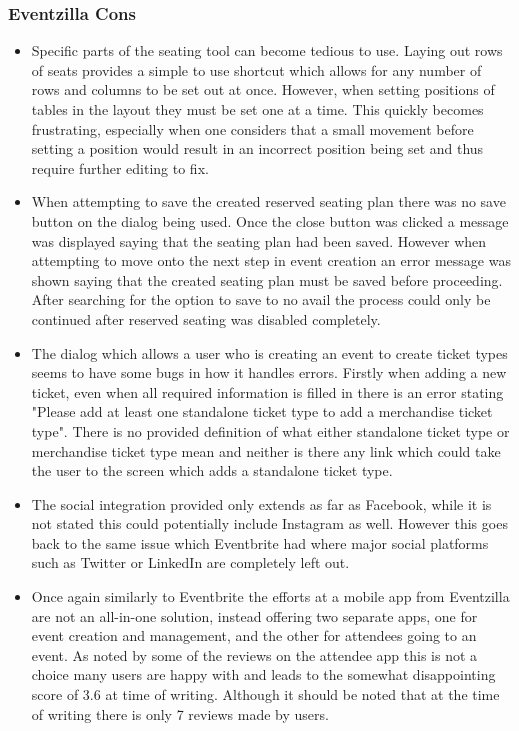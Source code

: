 \subsubsection{Eventzilla Cons}
\label{eventzillacons}

\begin{itemize}
    \item Specific parts of the seating tool can become tedious to use. Laying out rows of seats provides a simple to use shortcut which allows for any number of rows and columns to be set out at once. However, when setting positions of tables in the layout they must be set one at a time. This quickly becomes frustrating, especially when one considers that a small movement before setting a position would result in an incorrect position being set and thus require further editing to fix.
    \item When attempting to save the created reserved seating plan there was no save button on the dialog being used. Once the close button was clicked a message was displayed saying that the seating plan had been saved. However when attempting to move onto the next step in event creation an error message was shown saying that the created seating plan must be saved before proceeding. After searching for the option to save to no avail the process could only be continued after reserved seating was disabled completely.
    \item The dialog which allows a user who is creating an event to create ticket types seems to have some bugs in how it handles errors. Firstly when adding a new ticket, even when all required information is filled in there is an error stating "Please add at least one standalone ticket type to add a merchandise ticket type". There is no provided definition of what either standalone ticket type or merchandise ticket type mean and neither is there any link which could take the user to the screen which adds a standalone ticket type.
    \item The social integration provided only extends as far as Facebook, while it is not stated this could potentially include Instagram as well. However this goes back to the same issue which Eventbrite had where major social platforms such as Twitter or LinkedIn are completely left out.
    \item Once again similarly to Eventbrite the efforts at a mobile app from Eventzilla are not an all-in-one solution, instead offering two separate apps, one for event creation and management, and the other for attendees going to an event. As noted by some of the reviews\cite{eventzillaandroidapp} on the attendee app this is not a choice many users are happy with and leads to the somewhat disappointing score of 3.6 at time of writing. Although it should be noted that at the time of writing there is only 7 reviews made by users.

\end{itemize}
